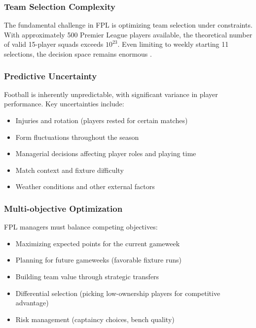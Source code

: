 \subsubsection{Team Selection Complexity}

The fundamental challenge in FPL is optimizing team selection under constraints. With approximately 500 Premier League players available, the theoretical number of valid 15-player squads exceeds $10^{23}$. Even limiting to weekly starting 11 selections, the decision space remains enormous \cite{matthews2012}.

\subsubsection{Predictive Uncertainty}

Football is inherently unpredictable, with significant variance in player performance. Key uncertainties include:
\begin{itemize}
    \item Injuries and rotation (players rested for certain matches)
    \item Form fluctuations throughout the season
    \item Managerial decisions affecting player roles and playing time
    \item Match context and fixture difficulty
    \item Weather conditions and other external factors \cite{bialkowski2014, bryson2013}
\end{itemize}

\subsubsection{Multi-objective Optimization}

FPL managers must balance competing objectives:
\begin{itemize}
    \item Maximizing expected points for the current gameweek
    \item Planning for future gameweeks (favorable fixture runs)
    \item Building team value through strategic transfers
    \item Differential selection (picking low-ownership players for competitive advantage)
    \item Risk management (captaincy choices, bench quality) \cite{matthews2013}
\end{itemize}

